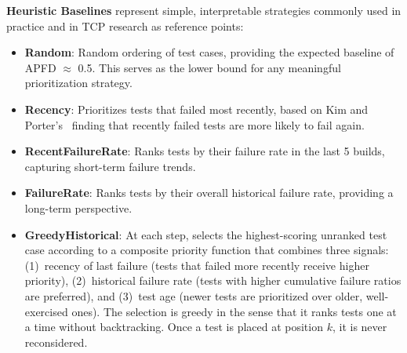 \documentclass[10pt,journal,compsoc]{IEEEtran}
\begin{document}
\textbf{Heuristic Baselines} represent simple, interpretable strategies commonly
used in practice and in TCP research as reference points:
\begin{itemize}
    \item \textbf{Random}: Random ordering of test cases, providing the expected
    baseline of APFD $\approx$ 0.5. This serves as the lower bound for any
    meaningful prioritization strategy.
    \item \textbf{Recency}: Prioritizes tests that failed most recently, based on
    Kim and Porter's~\cite{kim2002history} finding that recently failed tests are
    more likely to fail again.
    \item \textbf{RecentFailureRate}: Ranks tests by their failure rate in the
    last 5 builds, capturing short-term failure trends.
    \item \textbf{FailureRate}: Ranks tests by their overall historical failure
    rate, providing a long-term perspective.
    \item \textbf{GreedyHistorical}: At each step, selects the highest-scoring
    unranked test case according to a composite priority function that
    combines three signals: (1)~recency of last failure (tests that failed
    more recently receive higher priority), (2)~historical failure rate
    (tests with higher cumulative failure ratios are preferred), and
    (3)~test age (newer tests are prioritized over older, well-exercised
    ones). The selection is greedy in the sense that it ranks tests one at
    a time without backtracking. Once a test is placed at position $k$, it
    is never reconsidered.
\end{itemize}
\end{document}
